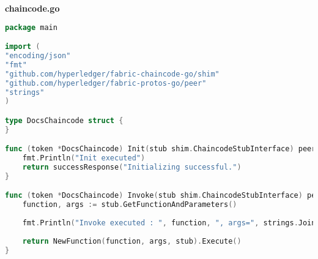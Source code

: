 \textbf{chaincode.go}
\begin{lstlisting}[language=Go]
package main

import (
"encoding/json"
"fmt"
"github.com/hyperledger/fabric-chaincode-go/shim"
"github.com/hyperledger/fabric-protos-go/peer"
"strings"
)

type DocsChaincode struct {
}

func (token *DocsChaincode) Init(stub shim.ChaincodeStubInterface) peer.Response {
	fmt.Println("Init executed")
	return successResponse("Initializing successful.")
}

func (token *DocsChaincode) Invoke(stub shim.ChaincodeStubInterface) peer.Response {
	function, args := stub.GetFunctionAndParameters()
	
	fmt.Println("Invoke executed : ", function, ", args=", strings.Join(args, ","))
	
	return NewFunction(function, args, stub).Execute()
}

\end{lstlisting}

